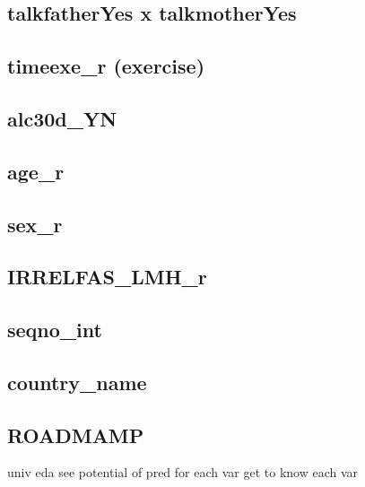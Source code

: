 \documentclass[
]{article}
\begin{document}
\subsection{talkfatherYes x
talkmotherYes}\label{talkfatheryes-x-talkmotheryes}

\subsection{timeexe\_r (exercise)}\label{timeexe_r-exercise}

\subsection{alc30d\_YN}\label{alc30d_yn}

\subsection{age\_r}\label{age_r}

\subsection{sex\_r}\label{sex_r}

\subsection{IRRELFAS\_LMH\_r}\label{irrelfas_lmh_r}

\subsection{seqno\_int}\label{seqno_int}

\subsection{country\_name}\label{country_name}

\subsection{ROADMAMP}\label{roadmamp}

univ eda see potential of pred for each var get to know each var
\end{document}
